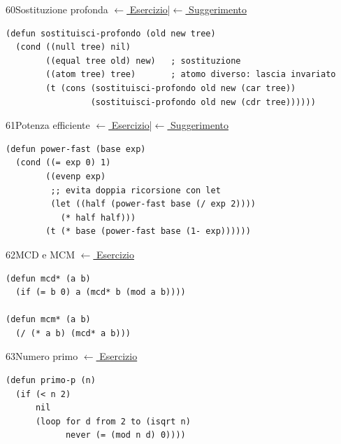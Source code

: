 \label{sol:60}
\begin{solbox}{60}{Sostituzione profonda}
\small\color{black!55}\hyperref[ex:60]{$\leftarrow$ Esercizio}\enspace\textcolor{black!30}{|}\enspace\hyperref[hint:60]{$\leftarrow$ Suggerimento}\normalsize\color{black}
\begin{lstlisting}
(defun sostituisci-profondo (old new tree)
  (cond ((null tree) nil)
        ((equal tree old) new)   ; sostituzione
        ((atom tree) tree)       ; atomo diverso: lascia invariato
        (t (cons (sostituisci-profondo old new (car tree))
                 (sostituisci-profondo old new (cdr tree))))))
\end{lstlisting}
\end{solbox}

\label{sol:61}
\begin{solbox}{61}{Potenza efficiente}
\small\color{black!55}\hyperref[ex:61]{$\leftarrow$ Esercizio}\enspace\textcolor{black!30}{|}\enspace\hyperref[hint:61]{$\leftarrow$ Suggerimento}\normalsize\color{black}
\begin{lstlisting}
(defun power-fast (base exp)
  (cond ((= exp 0) 1)
        ((evenp exp)
         ;; evita doppia ricorsione con let
         (let ((half (power-fast base (/ exp 2))))
           (* half half)))
        (t (* base (power-fast base (1- exp))))))
\end{lstlisting}
\end{solbox}

\label{sol:62}
\begin{solbox}{62}{MCD e MCM}
\small\color{black!55}\hyperref[ex:62]{$\leftarrow$ Esercizio}\normalsize\color{black}
\begin{lstlisting}
(defun mcd* (a b)
  (if (= b 0) a (mcd* b (mod a b))))

(defun mcm* (a b)
  (/ (* a b) (mcd* a b)))
\end{lstlisting}
\end{solbox}

\label{sol:63}
\begin{solbox}{63}{Numero primo}
\small\color{black!55}\hyperref[ex:63]{$\leftarrow$ Esercizio}\normalsize\color{black}
\begin{lstlisting}
(defun primo-p (n)
  (if (< n 2)
      nil
      (loop for d from 2 to (isqrt n)
            never (= (mod n d) 0))))
\end{lstlisting}
\end{solbox}

